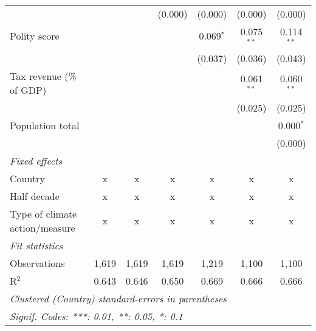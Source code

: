 \begin{tabular}{lcccccc}
                                                                                                 &         &                & (0.000)        & (0.000)        & (0.000)        & (0.000)\\   
   Polity score                                                                                  &         &                &                & 0.069$^{*}$    & 0.075$^{**}$   & 0.114$^{**}$\\   
                                                                                                 &         &                &                & (0.037)        & (0.036)        & (0.043)\\   
   Tax revenue (\% of GDP)                                                                       &         &                &                &                & 0.061$^{**}$   & 0.060$^{**}$\\   
                                                                                                 &         &                &                &                & (0.025)        & (0.025)\\   
   Population total                                                                              &         &                &                &                &                & 0.000$^{*}$\\   
                                                                                                 &         &                &                &                &                & (0.000)\\   
   \emph{Fixed effects}\\
   Country                                                                                       & x       & x              & x              & x              & x              & x\\  
   Half decade                                                                                   & x       & x              & x              & x              & x              & x\\  
   Type of climate action/measure                                                                & x       & x              & x              & x              & x              & x\\  
   \midrule \emph{Fit statistics}\\
   Observations                                                                                  & 1,619   & 1,619          & 1,619          & 1,219          & 1,100          & 1,100\\  
   R$^2$                                                                                         & 0.643   & 0.646          & 0.650          & 0.669          & 0.666          & 0.666\\  
   \midrule
   \multicolumn{7}{l}{\emph{Clustered (Country) standard-errors in parentheses}}\\
   \multicolumn{7}{l}{\emph{Signif. Codes: ***: 0.01, **: 0.05, *: 0.1}}\\
\end{tabular}
\par\endgroup


